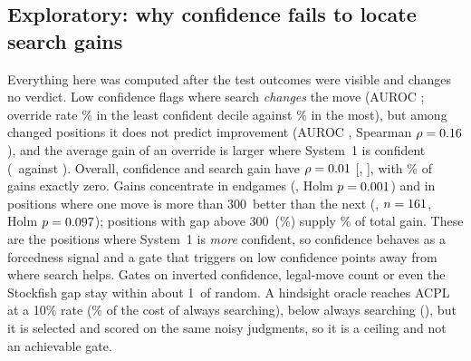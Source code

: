 \subsection{Exploratory: why confidence fails to locate search gains}
\label{sec:explore}
Everything here was computed after the test outcomes were visible and changes no verdict. Low confidence flags where search \emph{changes} the move (AUROC \aucChange; override rate \decChangeLow\% in the least confident decile against \decChangeHigh\% in the most), but among changed positions it does not predict improvement (AUROC \aucImprove, Spearman $\rho=0.16$), and the average gain of an override is larger where System~1 is confident (\chGainHigh\cp\ against \chGainLow\cp). Overall, confidence and search gain have $\rho=0.01$ [\rhoGainLo, \rhoGainHi], with \fracGainZero\% of gains exactly zero. Gains concentrate in endgames (\gainEnd\cp, Holm $p=0.001$) and in positions where one move is more than 300\cp\ better than the next (\gainSharp\cp, $n=161$, Holm $p=0.097$); positions with gap above 300\cp\ (\fracSharp\%) supply \shareSharp\% of total gain. These are the positions where System~1 is \emph{more} confident, so confidence behaves as a forcedness signal and a gate that triggers on low confidence points away from where search helps. Gates on inverted confidence, legal-move count or even the Stockfish gap stay within about 1\cp\ of random. A hindsight oracle reaches ACPL \oracleAcpl{} at a 10\% rate (\oracleCostPct\% of the cost of always searching), below always searching (\acplSTwo{}), but it is selected and scored on the same noisy judgments, so it is a ceiling and not an achievable gate.
